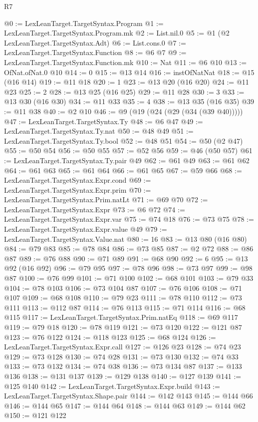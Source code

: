 \begin{lexlean}{R7}
\begin{coremodule}
@0 := LexLeanTarget.TargetSyntax.Program
@1 := LexLeanTarget.TargetSyntax.Program.mk
@2 := List.nil.{0}
@5 := @1 (@2 LexLeanTarget.TargetSyntax.Adt)
@6 := List.cons.{0}
@7 := LexLeanTarget.TargetSyntax.Function
@8 := @6 @7
@9 := LexLeanTarget.TargetSyntax.Function.mk
@10 := Nat
@11 := @6 @10
@13 := OfNat.ofNat.{0} @10
@14 := 0
@15 := @13 @14
@16 := instOfNatNat
@18 := @15 (@16 @14)
@19 := @11 @18
@20 := 1
@23 := @13 @20 (@16 @20)
@24 := @11 @23
@25 := 2
@28 := @13 @25 (@16 @25)
@29 := @11 @28
@30 := 3
@33 := @13 @30 (@16 @30)
@34 := @11 @33
@35 := 4
@38 := @13 @35 (@16 @35)
@39 := @11 @38
@40 := @2 @10
@46 := @9 (@19 (@24 (@29 (@34 (@39 @40)))))
@47 := LexLeanTarget.TargetSyntax.Ty
@48 := @6 @47
@49 := LexLeanTarget.TargetSyntax.Ty.nat
@50 := @48 @49
@51 := LexLeanTarget.TargetSyntax.Ty.bool
@52 := @48 @51
@54 := @50 (@2 @47)
@55 := @50 @54
@56 := @50 @55
@57 := @52 @56
@59 := @46 (@50 @57)
@61 := LexLeanTarget.TargetSyntax.Ty.pair @49
@62 := @61 @49
@63 := @61 @62
@64 := @61 @63
@65 := @61 @64
@66 := @61 @65
@67 := @59 @66
@68 := LexLeanTarget.TargetSyntax.Expr.cond
@69 := LexLeanTarget.TargetSyntax.Expr.prim
@70 := LexLeanTarget.TargetSyntax.Prim.natLt
@71 := @69 @70
@72 := LexLeanTarget.TargetSyntax.Expr
@73 := @6 @72
@74 := LexLeanTarget.TargetSyntax.Expr.var
@75 := @74 @18
@76 := @73 @75
@78 := LexLeanTarget.TargetSyntax.Expr.value @49
@79 := LexLeanTarget.TargetSyntax.Value.nat
@80 := 16
@83 := @13 @80 (@16 @80)
@84 := @79 @83
@85 := @78 @84
@86 := @73 @85
@87 := @2 @72
@88 := @86 @87
@89 := @76 @88
@90 := @71 @89
@91 := @68 @90
@92 := 6
@95 := @13 @92 (@16 @92)
@96 := @79 @95
@97 := @78 @96
@98 := @73 @97
@99 := @98 @87
@100 := @76 @99
@101 := @71 @100
@102 := @68 @101
@103 := @79 @33
@104 := @78 @103
@106 := @73 @104 @87
@107 := @76 @106
@108 := @71 @107
@109 := @68 @108
@110 := @79 @23
@111 := @78 @110
@112 := @73 @111
@113 := @112 @87
@114 := @76 @113
@115 := @71 @114
@116 := @68 @115
@117 := LexLeanTarget.TargetSyntax.Prim.natEq
@118 := @69 @117
@119 := @79 @18
@120 := @78 @119
@121 := @73 @120
@122 := @121 @87
@123 := @76 @122
@124 := @118 @123
@125 := @68 @124
@126 := LexLeanTarget.TargetSyntax.Expr.call
@127 := @126 @23
@128 := @74 @23
@129 := @73 @128
@130 := @74 @28
@131 := @73 @130
@132 := @74 @33
@133 := @73 @132
@134 := @74 @38
@136 := @73 @134 @87
@137 := @133 @136
@138 := @131 @137
@139 := @129 @138
@140 := @127 @139
@141 := @125 @140
@142 := LexLeanTarget.TargetSyntax.Expr.build
@143 := LexLeanTarget.TargetSyntax.Shape.pair
@144 := @142 @143
@145 := @144 @66
@146 := @144 @65
@147 := @144 @64
@148 := @144 @63
@149 := @144 @62
@150 := @121 @122

\end{coremodule}
\end{lexlean}
